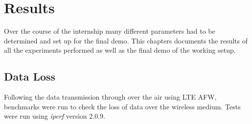 \chapter{Results}
\label{ch:results}

Over the course of the internship many different parameters had to be determined and set up for the final demo. This chapters documents the results of all the experiments performed as well as the final demo of the working setup.

\section{Data Loss}\label{ssec:DataLoss}

Following the data transmission through over the air using LTE AFW, benchmarks were run to check the loss of data over the wireless medium. Tests were run using \textit{iperf} version 2.0.9.

